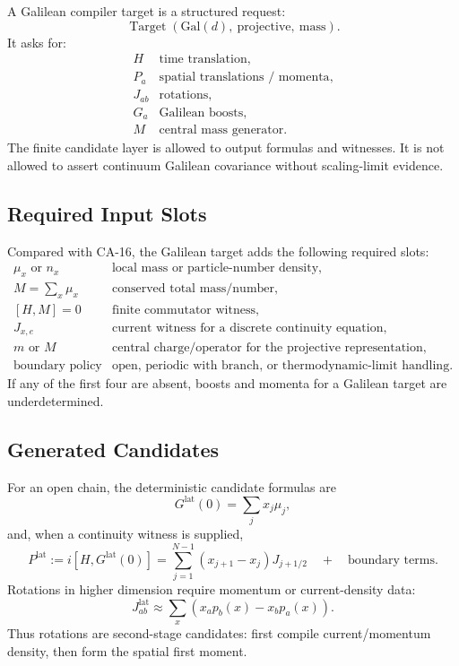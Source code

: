 A Galilean compiler target is a structured request:
\[
  \operatorname{Target}(\mathrm{Gal}(d),\ \mathrm{projective},\ \mathrm{mass}).
\]
It asks for:
\[
\begin{array}{ll}
H & \text{time translation},\\
P_a & \text{spatial translations / momenta},\\
J_{ab} & \text{rotations},\\
G_a & \text{Galilean boosts},\\
M & \text{central mass generator}.
\end{array}
\]
The finite candidate layer is allowed to output formulas and witnesses.  It is
not allowed to assert continuum Galilean covariance without scaling-limit
evidence.

\subsection{Required Input Slots}

Compared with CA-16, the Galilean target adds the following required slots:
\[
\begin{array}{ll}
\mu_x\text{ or }n_x
  & \text{local mass or particle-number density},\\
M=\sum_x\mu_x
  & \text{conserved total mass/number},\\
{}[H,M]=0
  & \text{finite commutator witness},\\
J_{x,e}
  & \text{current witness for a discrete continuity equation},\\
m\text{ or }M
  & \text{central charge/operator for the projective representation},\\
\text{boundary policy}
  & \text{open, periodic with branch, or thermodynamic-limit handling}.
\end{array}
\]
If any of the first four are absent, boosts and momenta for a Galilean target
are underdetermined.

\subsection{Generated Candidates}

For an open chain, the deterministic candidate formulas are
\[
  G^{\mathrm{lat}}(0)=\sum_j x_j\mu_j,
\]
and, when a continuity witness is supplied,
\[
  P^{\mathrm{lat}}
  :=
  i[H,G^{\mathrm{lat}}(0)]
  =
  \sum_{j=1}^{N-1}(x_{j+1}-x_j)J_{j+1/2}
  \quad+\quad\text{boundary terms}.
\]
Rotations in higher dimension require momentum or current-density data:
\[
  J_{ab}^{\mathrm{lat}}
  \approx
  \sum_x(x_a p_b(x)-x_b p_a(x)).
\]
Thus rotations are second-stage candidates: first compile current/momentum
density, then form the spatial first moment.


